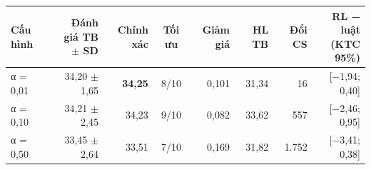 \begin{tabular}{lrrcrrrr}
\toprule
Cấu hình & \makecell[r]{Đánh giá TB\\\(\pm\) SD} & Chính xác & Tối ưu & Giảm giá & HL TB & Đổi CS & \makecell[r]{RL − luật\\(KTC 95\%)} \\
\midrule
α = 0,01 & 34{,}20 $\pm$ 1{,}65 & \textbf{34{,}25} & 8/10 & 0{,}101 & 31{,}34 & 16 & [\ensuremath{-}1{,}94; 0{,}40] \\
α = 0,10 & 34{,}21 $\pm$ 2{,}45 & 34{,}23 & 9/10 & 0{,}082 & 33{,}62 & 557 & [\ensuremath{-}2{,}46; 0{,}95] \\
α = 0,50 & 33{,}45 $\pm$ 2{,}64 & 33{,}51 & 7/10 & 0{,}169 & 31{,}82 & 1{.}752 & [\ensuremath{-}3{,}41; 0{,}38] \\
\bottomrule
\end{tabular}
